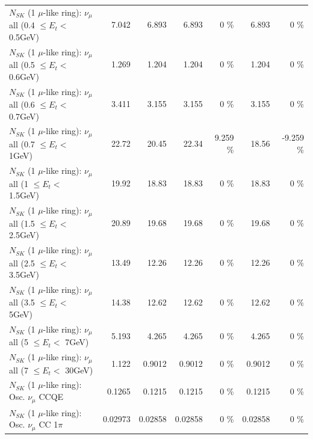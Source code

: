 \begin{table}
\begin{tabular}{| l | r | r | r  r | r  r |}
       $N_{SK}$ (1 $\mu$-like ring): $\nu_{\mu}$ all (0.4 $\leq E_{t} <$ 0.5GeV) &           7.042 &           6.893 &           6.893 &        0 \%  &           6.893 &        0 \%  \\ 
       $N_{SK}$ (1 $\mu$-like ring): $\nu_{\mu}$ all (0.5 $\leq E_{t} <$ 0.6GeV) &           1.269 &           1.204 &           1.204 &        0 \%  &           1.204 &        0 \%  \\ 
       $N_{SK}$ (1 $\mu$-like ring): $\nu_{\mu}$ all (0.6 $\leq E_{t} <$ 0.7GeV) &           3.411 &           3.155 &           3.155 &        0 \%  &           3.155 &        0 \%  \\ 
         $N_{SK}$ (1 $\mu$-like ring): $\nu_{\mu}$ all (0.7 $\leq E_{t} <$ 1GeV) &           22.72 &           20.45 &           22.34 &    9.259 \%  &           18.56 &   -9.259 \%  \\ 
         $N_{SK}$ (1 $\mu$-like ring): $\nu_{\mu}$ all (1 $\leq E_{t} <$ 1.5GeV) &           19.92 &           18.83 &           18.83 &        0 \%  &           18.83 &        0 \%  \\ 
       $N_{SK}$ (1 $\mu$-like ring): $\nu_{\mu}$ all (1.5 $\leq E_{t} <$ 2.5GeV) &           20.89 &           19.68 &           19.68 &        0 \%  &           19.68 &        0 \%  \\ 
       $N_{SK}$ (1 $\mu$-like ring): $\nu_{\mu}$ all (2.5 $\leq E_{t} <$ 3.5GeV) &           13.49 &           12.26 &           12.26 &        0 \%  &           12.26 &        0 \%  \\ 
         $N_{SK}$ (1 $\mu$-like ring): $\nu_{\mu}$ all (3.5 $\leq E_{t} <$ 5GeV) &           14.38 &           12.62 &           12.62 &        0 \%  &           12.62 &        0 \%  \\ 
           $N_{SK}$ (1 $\mu$-like ring): $\nu_{\mu}$ all (5 $\leq E_{t} <$ 7GeV) &           5.193 &           4.265 &           4.265 &        0 \%  &           4.265 &        0 \%  \\ 
          $N_{SK}$ (1 $\mu$-like ring): $\nu_{\mu}$ all (7 $\leq E_{t} <$ 30GeV) &           1.122 &          0.9012 &          0.9012 &        0 \%  &          0.9012 &        0 \%  \\ 
\hline
\hline
                               $N_{SK}$ (1 $\mu$-like ring): Osc. $\nu_\mu$ CCQE &          0.1265 &          0.1215 &          0.1215 &        0 \%  &          0.1215 &        0 \%  \\ 
                          $N_{SK}$ (1 $\mu$-like ring): Osc. $\nu_\mu$ CC 1$\pi$ &         0.02973 &         0.02858 &         0.02858 &        0 \%  &         0.02858 &        0 \%  \\ 

\end{tabular}
\end{table}
